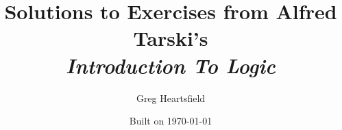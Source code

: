 \documentclass[fleqn]{article}
\begin{document}
\title{Solutions to Exercises from Alfred Tarski's \\ \emph{Introduction To Logic}}
\date{Built on \today}
\author{Greg Heartsfield}
\maketitle


\end{document}

